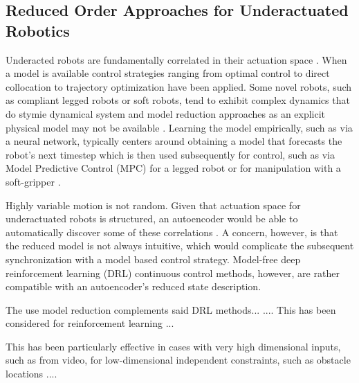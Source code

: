 \documentclass[letterpaper, 10 pt, conference]{ieeeconf}
\begin{document}



\subsection{Reduced Order Approaches for Underactuated Robotics}

Underacted robots are fundamentally correlated in their actuation space  \cite{tedrake2009underactuated}.  When a model is available control strategies ranging from optimal control \cite{betts2010practical} to direct collocation \cite{von1993numerical} to trajectory optimization \cite{kalakrishnan2011stomp} have been applied.  Some novel robots, such as compliant legged robots or soft robots, tend to exhibit complex dynamics that do stymie dynamical system and model reduction approaches as an explicit physical model may not be available \cite{nakajima2015information}.  Learning the model empirically, such as via a neural network, typically centers around obtaining a model that forecasts the robot's next timestep which is then used subsequently for control, such as via Model Predictive Control (MPC)  for a legged robot \cite{nagabandi2018learning} or for manipulation with a soft-gripper \cite{nishimura2017thin}.  

Highly variable motion is not random.  Given that actuation space for underactuated robots is structured, an autoencoder would be able to automatically discover some of these correlations \cite{AE_hinton2006reducing, ngsparse}.  A concern, however, is that the reduced model is not always intuitive, which would complicate the subsequent synchronization with a model based control strategy.   Model-free deep reinforcement learning (DRL) continuous control methods, however, are rather compatible with an autoencoder's reduced state description.

The use model reduction complements said DRL methods...
.... This has been considered for reinforcement learning ... 

This has been particularly effective in cases with very high dimensional inputs, such as from video, for low-dimensional independent constraints, such as obstacle locations \cite{finn2016deep, lynch2019learning}....
\end{document}
